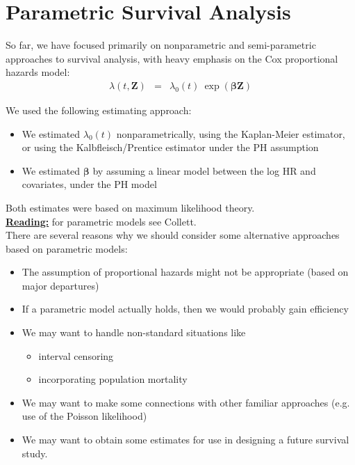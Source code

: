 \documentclass[11pt,psfig]{book}
\newcommand{\bfZ}{\mathbf{Z}}
\newcommand{\bfbeta}{\mathbf{\beta}}
\begin{document}
\setcounter{page}{151}\setcounter{chapter}{9}
\chapter{Parametric Survival Analysis}
So far, we have focused primarily on nonparametric and
semi-parametric approaches to survival analysis, with heavy
emphasis on the Cox proportional hazards model:
\begin{eqnarray*}
\lambda(t,\bfZ) & = & \lambda_0(t) ~ \exp(\bfbeta \bfZ)
\end{eqnarray*}

We used the following estimating approach:
\begin{itemize}
\item We estimated $\lambda_0(t)$ nonparametrically,
using the Kaplan-Meier estimator, or using the
Kalbfleisch/Prentice estimator under the PH assumption
\item We estimated $\bfbeta$ by assuming a linear model
between the log HR and covariates, under the PH model
\end{itemize}
Both estimates were based on maximum likelihood theory.
\\[2ex]
\underline{\bf Reading:} for parametric models see Collett.
\\[2ex]
There are several reasons why we should consider some
alternative approaches based on parametric models:
\begin{itemize}
\item  The assumption of proportional hazards might not be
appropriate (based on major departures)
\item  If a parametric model actually holds, then we would probably
gain efficiency
\newpage
\item  We may want to handle non-standard situations like
\begin{itemize}
\item  interval censoring
\item  incorporating population mortality
\end{itemize}
\item  We may want to make some connections with other
familiar approaches
 (e.g. use of the Poisson likelihood)
\item We may want to obtain some estimates for use in designing a
future survival study.
\end{itemize}
\end{document}
